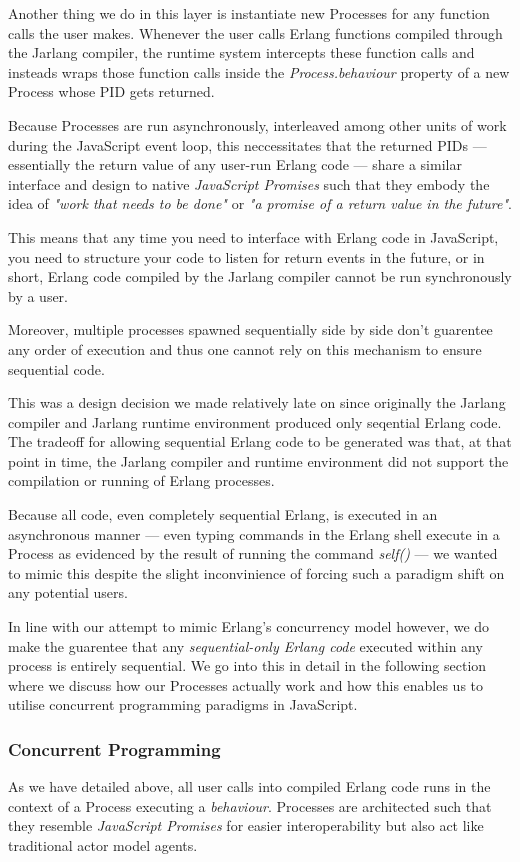 \documentclass[twoside,12pt,titlepage,a4paper]{article}
\begin{document}
Another thing we do in this layer is instantiate new Processes for any function calls the user makes. Whenever the user calls Erlang functions compiled through the Jarlang compiler, the runtime system intercepts these function calls and insteads wraps those function calls inside the \textit{Process.behaviour} property of a new Process whose PID gets returned.

Because Processes are run asynchronously, interleaved among other units of work during the JavaScript event loop, this neccessitates that the returned PIDs --- essentially the return value of any user-run Erlang code --- share a similar interface and design to native \textit{JavaScript Promises} such that they embody the idea of \textit{"work that needs to be done"} or \textit{"a promise of a return value in the future"}.

This means that any time you need to interface with Erlang code in JavaScript, you need to structure your code to listen for return events in the future, or in short, Erlang code compiled by the Jarlang compiler cannot be run synchronously by a user.

Moreover, multiple processes spawned sequentially side by side don't guarentee any order of execution and thus one cannot rely on this mechanism to ensure sequential code.

This was a design decision we made relatively late on since originally the Jarlang compiler and Jarlang runtime environment produced only seqential Erlang code. The tradeoff for allowing sequential Erlang code to be generated was that, at that point in time, the Jarlang compiler and runtime environment did not support the compilation or running of Erlang processes.

Because all code, even completely sequential Erlang, is executed in an asynchronous manner --- even typing commands in the Erlang shell execute in a Process as evidenced by the result of running the command \textit{self()} --- we wanted to mimic this despite the slight inconvinience of forcing such a paradigm shift on any potential users.

In line with our attempt to mimic Erlang's concurrency model however, we do make the guarentee that any \textit{sequential-only Erlang code} executed within any process is entirely sequential. We go into this in detail in the following section where we discuss how our Processes actually work and how this enables us to utilise concurrent programming paradigms in JavaScript. 

\subsubsection{Concurrent Programming} \label{sssec:num2}
As we have detailed above, all user calls into compiled Erlang code runs in the context of a Process executing a \textit{behaviour}. Processes are architected such that they resemble \textit{JavaScript Promises} for easier interoperability but also act like traditional actor model agents.
\end{document}
